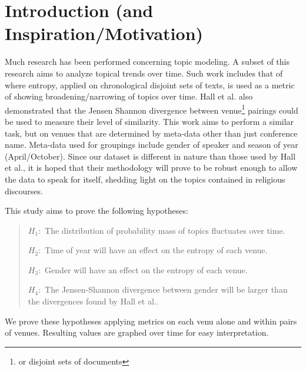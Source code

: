 \section {Introduction (and Inspiration/Motivation)}

Much research has been performed concerning topic modeling. A subset of this research aims to analyze topical trends over time. Such work includes that of \cite{hall-jurafsky-manning:2008:EMNLP} where entropy, applied on chronological disjoint sets of texts, is used as a metric of showing broadening/narrowing of topics over time. Hall et al. also demonstrated that the Jensen Shannon divergence between venue\footnote{or disjoint sets of documents} pairings could be used to measure their level of similarity. This work aims to perform a similar task, but on venues that are determined by meta-data other than just conference name. Meta-data used for groupings include gender of speaker and season of year (April/October). Since our dataset is different in nature than those used by Hall et al., it is hoped that their methodology will prove to be robust enough to allow the data to speak for itself, shedding light on the topics contained in religious discourses.

This study aims to prove the following hypotheses:
	\begin{quote}
		$H_{1}:$ The distribution of probability mass of topics fluctuates over time. 
		
		$H_{2}:$ Time of year will have an effect on the entropy of each venue.

		$H_{3}:$ Gender will have an effect on the entropy of each venue.

		$H_{4}:$ The Jensen-Shannon divergence between gender will be larger than the divergences found by Hall et al..
	\end{quote}

We prove these hypotheses applying metrics on each venu alone and within pairs of venues. Resulting values are graphed over time for easy interpretation.